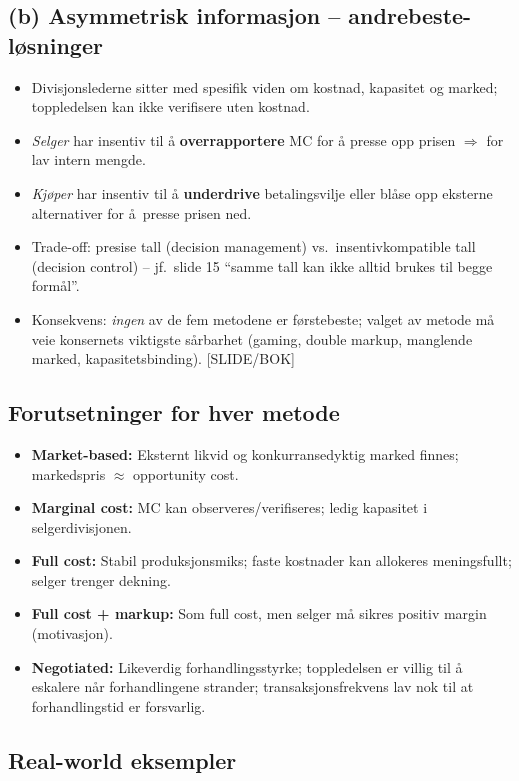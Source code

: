 \subsection*{(b) Asymmetrisk informasjon -- andrebeste-løsninger}
\begin{itemize}\setlength{\itemsep}{2pt}
\item Divisjonslederne sitter med spesifik viden om kostnad, kapasitet og marked; toppledelsen kan ikke verifisere uten kostnad.
\item \emph{Selger} har insentiv til å \textbf{overrapportere} MC for å presse opp prisen $\Rightarrow$ for lav intern mengde.
\item \emph{Kj\o per} har insentiv til å \textbf{underdrive} betalingsvilje eller bl\aa se opp eksterne alternativer for \aa\ presse prisen ned.
\item Trade-off: presise tall (decision management) vs.\ insentivkompatible tall (decision control) -- jf.\ slide 15 ``samme tall kan ikke alltid brukes til begge formål''.
\item Konsekvens: \emph{ingen} av de fem metodene er førstebeste; valget av metode må veie konsernets viktigste sårbarhet (gaming, double markup, manglende marked, kapasitetsbinding). [SLIDE/BOK]
\end{itemize}

\subsection*{Forutsetninger for hver metode}
\begin{itemize}\setlength{\itemsep}{2pt}
\item \textbf{Market-based:} Eksternt likvid og konkurransedyktig marked finnes; markedspris $\approx$ opportunity cost.
\item \textbf{Marginal cost:} MC kan observeres/verifiseres; ledig kapasitet i selgerdivisjonen.
\item \textbf{Full cost:} Stabil produksjonsmiks; faste kostnader kan allokeres meningsfullt; selger trenger dekning.
\item \textbf{Full cost + markup:} Som full cost, men selger må sikres positiv margin (motivasjon).
\item \textbf{Negotiated:} Likeverdig forhandlingsstyrke; toppledelsen er villig til å eskalere når forhandlingene strander; transaksjonsfrekvens lav nok til at forhandlingstid er forsvarlig.
\end{itemize}

\subsection*{Real-world eksempler}

